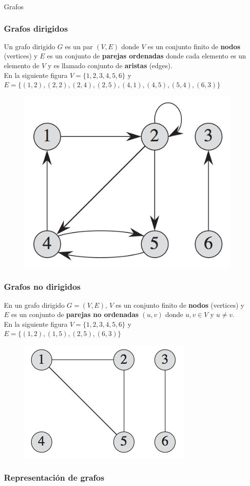 \documentclass{beamer}
\begin{document}
\begin{section}{Grafos}
	\begin{frame}
		\frametitle{Grafos dirigidos}
		Un grafo dirigido $G$ es un par $(V, E)$ donde $V$ es un conjunto finito de \textbf{nodos} (vertices) y $E$ es un conjunto de \textbf{parejas ordenadas} donde cada elemento es un elemento de $V$ y es llamado conjunto de \textbf{aristas} (edges).\\
		En la siguiente figura $V = \{1, 2, 3, 4, 5, 6\}$ y $E = \{(1, 2), (2, 2), (2, 4), (2, 5), (4, 1), (4, 5), (5, 4), (6, 3)\}$
		\begin{figure}
			\includegraphics[height = 0.35\textheight]{digraph.png}
		\end{figure}		
	\end{frame}
	
	\begin{frame}
		\frametitle{Grafos no dirigidos}
		En un grafo dirigido $G = (V, E)$, $V$ es un conjunto finito de \textbf{nodos} (vertices) y $E$ es un conjunto de \textbf{parejas no ordenadas} $(u, v)$ donde $u, v \in V$ y $u \ne v$.\\
		En la siguiente figura $V = \{1, 2, 3, 4, 5, 6\}$ y $E = \{(1, 2), (1, 5), (2, 5), (6, 3)\}$
		\begin{figure}
			\includegraphics[height = 0.35\textheight]{graph.png}
		\end{figure}		
	\end{frame}
	
	\begin{frame}
		\frametitle{Representación de grafos}
		
		
	\end{frame}
	
\end{section}
\end{document}
